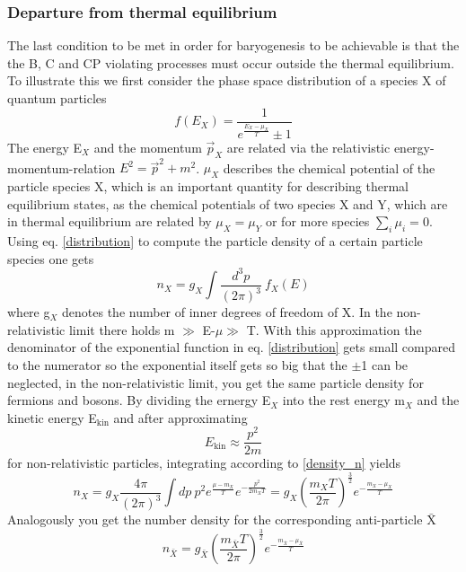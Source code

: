 \subsubsection{Departure from thermal equilibrium}
The last condition to be met in order for baryogenesis to be achievable is that the the B, C and CP violating processes must occur outside the thermal equilibrium. To illustrate this we first consider the phase space distribution of a species X of quantum particles
\begin{equation}
	f(E_X)=\frac{1}{e^{\frac{E_X-\mu_X}{T}}\pm1}
	\label{distribution}
\end{equation}
The energy E$_X$ and the momentum $\vec{p}_X$ are related via the relativistic energy-momentum-relation $E^2=\vec{p}^2+m^2$. $\mu_X$ describes the chemical potential of the particle species X, which is an important quantity for describing thermal equilibrium states, as the chemical potentials of two species X and Y, which are in thermal equilibrium are related by $\mu_X=\mu_Y$ or for more species $\sum_i\mu_i=0$.\newline
Using eq. \ref{distribution} to compute the particle density of a certain particle species one gets 
\begin{equation}
	n_X=g_X\int\frac{d^3p}{(2\pi)^3}\:f_X(E)
	\label{density_n}
\end{equation}
where g$_X$ denotes the number of inner degrees of freedom of X. \newline
In the non-relativistic limit there holds m $\gg$ E-$\mu\gg$ T. With this approximation the denominator of the exponential function in eq. \ref{distribution} gets small compared to the numerator so the exponential itself gets so big that the $\pm$1 can be neglected, in the non-relativistic limit, you get the same particle density for fermions and bosons. By dividing the ernergy E$_X$ into the rest energy m$_X$ and the kinetic energy E$_{\text{kin}}$ and after approximating
\begin{equation}
	E_{\text{kin}}\approx\frac{p^2}{2m}
\end{equation}
for non-relativistic particles, integrating according to \ref{density_n} yields
\begin{equation}
n_X=g_X\frac{4\pi}{(2\pi)^3}\int dp\:p^2e^\frac{\mu-m_X}{T}e^{-\frac{p^2}{2m_XT}}=g_X\left(\frac{m_XT}{2\pi}\right)^\frac{3}{2}e^{-\frac{m_X-\mu_X}{T}}
\label{numerX}
\end{equation}
Analogously you get the number density for the corresponding anti-particle $\bar{\text{X}}$
\begin{equation}
	n_{\bar{X}}=g_{\bar{X}}\left(\frac{m_{\bar{X}}T}{2\pi}\right)^\frac{3}{2}e^{-\frac{m_{\bar{X}}-\mu_{\bar{X}}}{T}}
\label{numberantiX}
\end{equation}
